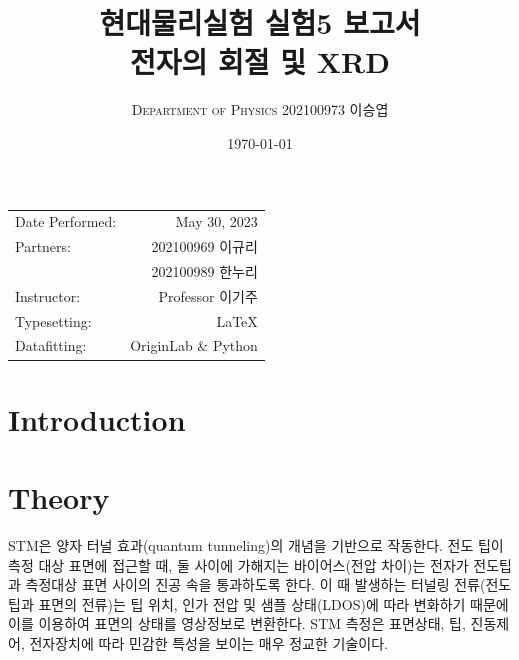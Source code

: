 \documentclass[a4paper, 10pt, nanum]{CSUniSchoolLabReport}
\title{현대물리실험 실험5 보고서 \\ 전자의 회절 및 XRD} %
\author{\textsc{Department of Physics} 202100973 이승엽}
\date{\today}
\begin{document}
\maketitle %

\begin{center}
	\begin{tabular}{l r}
		Date Performed: & May 30, 2023 \\ %
		Partners: & 202100969 이규리 \\ %
		& 202100989 한누리 \\
		Instructor: & Professor 이기주 \\ %
		Typesetting: & LaTeX \\
		Datafitting: & OriginLab \& Python \\
	\end{tabular}
\end{center}


\maketitle


\section{Introduction}




\section{Theory}

	STM은 양자 터널 효과(quantum tunneling)의 개념을 기반으로 작동한다. 전도 팁이 측정 대상 표면에 접근할 때, 둘 사이에 가해지는 바이어스(전압 차이)는 전자가 전도팁과 측정대상 표면 사이의 진공 속을 통과하도록 한다. 이 때 발생하는 터널링 전류(전도팁과 표면의 전류)는 팁 위치, 인가 전압 및 샘플 상태(LDOS)에 따라 변화하기 때문에 이를 이용하여 표면의 상태를 영상정보로 변환한다. STM 측정은 표면상태, 팁, 진동제어, 전자장치에 따라 민감한 특성을 보이는 매우 정교한 기술이다.
\end{document}
